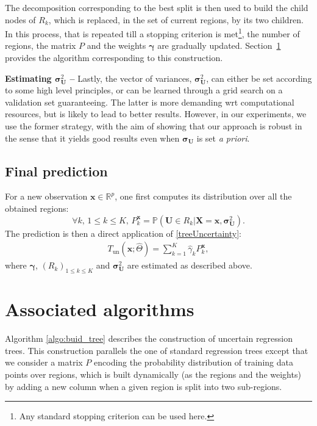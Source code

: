 \documentclass[twoside,11pt]{article}
\begin{document}
The decomposition corresponding to the best split is then used to build the child nodes of $R_k$, which is replaced, in the set of current regions, by its two children. In this process, that is repeated till a stopping criterion is met\footnote{Any standard stopping criterion can be used here.}, the number of regions, the matrix $P$ and the weights $\boldsymbol{\gamma}$ are gradually updated. Section~\ref{sec:algo} provides the algorithm corresponding to this construction.

\noindent \textbf{Estimating $\boldsymbol{\sigma}_{\boldsymbol{U}}^2$ --} Lastly, the vector of variances, $\boldsymbol{\sigma}_{\boldsymbol{U}}^2$,
can either be set according to some high level principles, or can be learned through a grid search on a validation set guaranteeing. The latter is more demanding wrt computational resources, but is likely to lead to better results. However, in our experiments, we use the former strategy, with the aim of showing that our approach is robust in the sense that it yields good results even when $\boldsymbol{\sigma_U}$ is set \textit{a priori}.


\subsection{Final prediction}

For a new observation $\boldsymbol{x}\in \mathbb{R}^p$, one first computes its distribution over all the obtained regions:
%
$$ \forall k, \, 1\leq k \leq K, \, P^{\boldsymbol{x}}_k = \mathbb{P}\left(\boldsymbol{U} \in {R}_{k}| \boldsymbol{X} = \boldsymbol{x}, {\boldsymbol{\sigma}}_{\boldsymbol{U}}^2 \right) .$$
%
The prediction is then a direct application of \eqref{treeUncertainty}:
%
\begin{align}
    T_{\text{un}}\left(\boldsymbol{x}; \hat{\Theta}\right) = \sum_{k=1}^K \hat{\gamma}_k P^{\boldsymbol{x}}_k,
  \label{pred:untree}
\end{align}
%
where $\boldsymbol{\gamma}$, $(R_k)_{1 \le k \le K}$ and $\boldsymbol{\sigma}_{\boldsymbol{U}}^2$ are estimated as described above.
%

\section{Associated algorithms}
\label{sec:algo}

Algorithm \ref{algo:buid_tree} describes the construction of uncertain regression trees. This construction parallels the one of standard regression trees except that we consider a matrix $P$ encoding the probability distribution of training data points over regions, which is built dynamically (as the regions and the weights) by adding a new column when a given region is split into two sub-regions.
\end{document}
